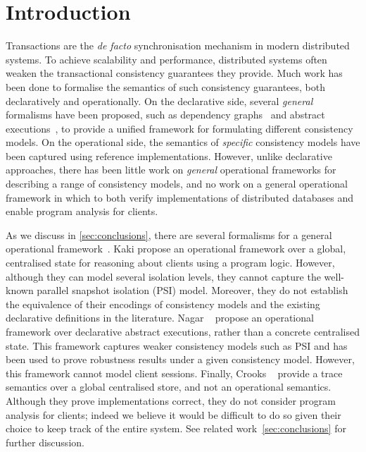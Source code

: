 \section{Introduction}
Transactions are the \emph{de facto} synchronisation mechanism in modern distributed systems.
To achieve scalability and performance, distributed systems often weaken the transactional consistency guarantees they provide. 
%
%
Much work has been done to formalise the semantics of such consistency guarantees, both
declaratively and operationally.
On the declarative side, several \emph{general} formalisms have been proposed, 
such as dependency graphs~\cite{.} and abstract executions~\cite{.}, to provide a unified
framework for formulating different consistency models.  
On the operational side, the semantics of \emph{specific} consistency models have
been captured using reference implementations. 
However, unlike declarative approaches, there has been
little work on \emph{general} operational frameworks for describing a range
of consistency models, and no work on a general operational framework
in which to both verify implementations of distributed databases and 
enable program analysis for clients.

As we discuss in \cref{sec:conclusions}, there are several formalisms for a general operational framework~\cite{sureshConcur,.,.}. 
Kaki \etal propose an operational framework over a global, centralised state for reasoning about clients using a program logic. 
However, although they can model several isolation levels, they cannot capture the well-known
parallel snapshot isolation (PSI) model. 
Moreover, they do not establish the equivalence of their encodings of consistency models 
and the existing declarative definitions in the literature. 
Nagar \etal~\cite{.} propose an operational framework over declarative abstract executions, rather than a concrete centralised state. This framework captures weaker consistency models
such as PSI and has been used to prove robustness results under a given consistency model.  
However, this framework cannot model client sessions.
Finally, Crooks \etal~\cite{.} provide a trace semantics over a global
centralised store, and not an operational semantics. 
Although they prove implementations correct, they do not consider program analysis for clients;
indeed we believe it would be difficult to do so given their choice to
keep track of the entire system.
See related work~\cref{sec:conclusions} for further discussion. 




